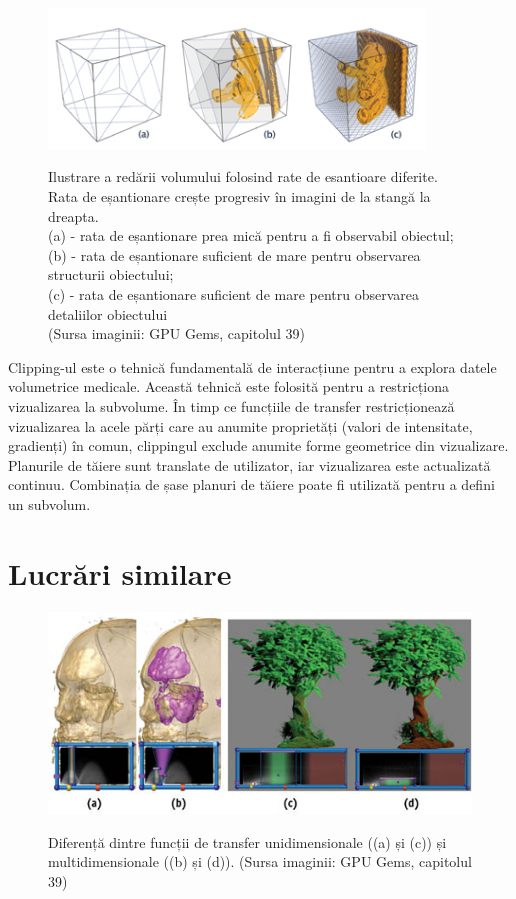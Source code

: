 \begin{figure}[!htb]
    \centering
    \captionsetup{justification=centering}
    \includegraphics[width=10cm]{images/sample_rate.jpg}
    \\
    \caption{Ilustrare a redării volumului folosind rate de esantioare diferite. Rata de eșantionare crește progresiv în imagini de la stangă la dreapta.
    \\
    (a) - rata de eșantionare prea mică pentru a fi observabil obiectul;
    \\
    (b) - rata de eșantionare suficient de mare pentru observarea structurii obiectului;
    \\
    (c) - rata de eșantionare suficient de mare pentru observarea detaliilor obiectului
    \\
    (Sursa imaginii: GPU Gems, capitolul 39\cite{gpugems39})}
    \label{fig:sample_rate}
\end{figure}

Clipping-ul este o tehnică fundamentală de interacțiune pentru a explora datele volumetrice medicale. Această tehnică este folosită pentru a restricționa vizualizarea la subvolume. În timp ce funcțiile de transfer restricționează vizualizarea la acele părți care au anumite proprietăți (valori de intensitate, gradienți) în comun, clippingul exclude anumite forme geometrice din vizualizare. Planurile de tăiere sunt translate de utilizator, iar vizualizarea este actualizată continuu. Combinația de șase planuri de tăiere poate fi utilizată pentru a defini un subvolum.


\section{Lucrări similare}

\begin{figure}[!htb]
    \centering
    \includegraphics[width=12cm]{images/2d_tf.jpg}
    \\
    \caption{Diferență dintre funcții de transfer unidimensionale ((a) și (c)) și multidimensionale ((b) și (d)). (Sursa imaginii: GPU Gems, capitolul 39\cite{gpugems39})}
    \label{fig:ilustr_2dtf}
\end{figure}

